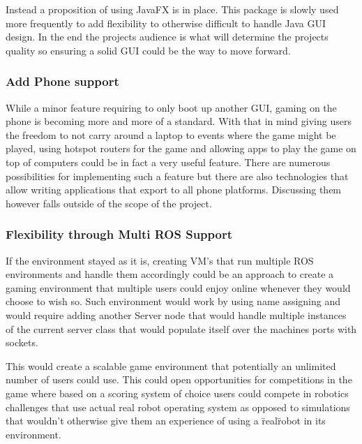 \documentclass{report}
\begin{document}
        Instead a proposition of using JavaFX is in place. This package is slowly used more frequently to add flexibility to otherwise difficult to handle Java GUI design. In the end the projects audience is what will determine the projects quality so ensuring a solid GUI could be the way to move forward.

      \subsubsection{Add Phone support}
        While a minor feature requiring to only boot up another GUI, gaming on the phone is becoming more and more of a standard. With that in mind giving users the freedom to not carry around a laptop to events where the game might be played, using hotspot routers for the game and allowing apps to play the game on top of computers could be in fact a very useful feature. There are numerous possibilities for implementing such a feature but there are also technologies that allow writing applications that export to all phone platforms. Discussing them however falls outside of the scope of the project.

      \subsubsection{Flexibility through Multi ROS Support}
        If the environment stayed as it is, creating VM's that run multiple ROS environments and handle them accordingly could be an approach to create a gaming environment that multiple users could enjoy online whenever they would choose to wish so. Such environment would work by using name assigning and would require adding another Server node that would handle multiple instances of the current server class that would populate itself over the machines ports with sockets. 

        This would create a scalable game environment that potentially an unlimited number of users could use. This could open opportunities for competitions in the game where based on a scoring system of choice users could compete in robotics challenges that use actual real robot operating system as opposed to simulations that wouldn't otherwise give them an experience of using a \"real\" robot in its environment.
      
\end{document}
